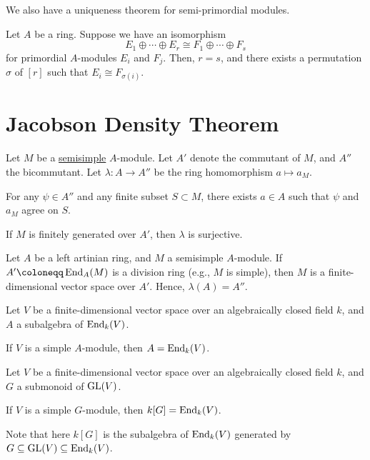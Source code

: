 \documentclass[12pt]{article}
\begin{document}
We also have a uniqueness theorem for semi-primordial modules.

\begin{thm}
	Let $A$ be a ring. Suppose we have an isomorphism
	\begin{equation*} 
		E_{1} \oplus \cdots \oplus E_{r} \cong F_{1} \oplus \cdots \oplus F_{s}
	\end{equation*}
	for primordial $A$-modules $E_{i}$ and $F_{j}$. 
	Then, $r = s$, 
	and there exists a permutation $\sigma$ of $[r]$ such that 
	$E_{i} \cong F_{\sigma(i)}$.
\end{thm}

\section{Jacobson Density Theorem}

\begin{thm} \label{thm:jacobson-density-theorem}
	Let $M$ be a \underline{semisimple} $A$-module. 
	Let $A'$ denote the commutant of $M$, and $A''$ the bicommutant. 
	Let $\lambda \colon A \to A''$ be the ring homomorphism $a \mapsto a_{M}$.

	For any $\psi \in A''$ and any finite subset $S \subset M$, 
	there exists $a \in A$ such that $\psi$ and $a_{M}$ agree on $S$.

	If $M$ is finitely generated over $A'$, then $\lambda$ is surjective.
\end{thm}
\begin{cor} \label{cor:left-artin-semisimple-commutant-division-ring}
	Let $A$ be a left artinian ring, and $M$ a semisimple $A$-module. 
	If $A' \coloneqq \End_{A}(M)$ is a division ring (e.g., $M$ is simple), 
	then $M$ is a finite-dimensional vector space over $A'$. 
	Hence, $\lambda(A) = A''$.
\end{cor}
\begin{cor}
	Let $V$ be a finite-dimensional vector space over an algebraically closed field $k$, 
	and $A$ a subalgebra of $\operatorname{End}_{k}(V)$. 

	If $V$ is a simple $A$-module, then $A = \operatorname{End}_{k}(V)$.
\end{cor}
\begin{cor}
	Let $V$ be a finite-dimensional vector space over an algebraically closed field $k$, 
	and $G$ a submonoid of $\operatorname{GL}(V)$. 

	If $V$ is a simple $G$-module, then $k[G] = \operatorname{End}_{k}(V)$.
\end{cor}
Note that here $k[G]$ is the subalgebra of $\operatorname{End}_{k}(V)$ generated by $G \subseteq \operatorname{GL}(V) \subseteq \operatorname{End}_{k}(V)$.
\end{document}
